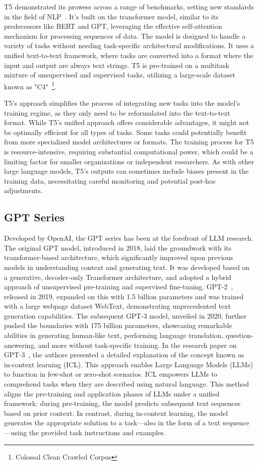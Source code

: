 T5 demonstrated its prowess across a range of benchmarks, setting new standards in the field of NLP~\cite{t5}.
It's built on the transformer model, similar to its predecessors like BERT and GPT, leveraging the effective self-attention mechanism for processing sequences of data.
The model is designed to handle a variety of tasks without needing task-specific architectural modifications.
It uses a unified text-to-text framework, where tasks are converted into a format where the input and output are always text strings.
T5 is pre-trained on a multitask mixture of unsupervised and supervised tasks, utilizing a large-scale dataset known as "C4"~\footnote{Colossal Clean Crawled Corpus}.

T5's approach simplifies the process of integrating new tasks into the model's training regime, as they only need to be reformulated into the text-to-text format.
While T5's unified approach offers considerable advantages, it might not be optimally efficient for all types of tasks.
Some tasks could potentially benefit from more specialized model architectures or formats.
The training process for T5 is resource-intensive, requiring substantial computational power, which could be a limiting factor for smaller organizations or independent researchers.
As with other large language models, T5's outputs can sometimes include biases present in the training data, necessitating careful monitoring and potential post-hoc adjustments.

\subsection{GPT Series}
\label{subsec:gpt-series}

Developed by OpenAI, the GPT series has been at the forefront of LLM research.
The original GPT model, introduced in 2018, laid the groundwork with its transformer-based architecture, which significantly improved upon previous models in understanding context and generating text.
It was developed based on a generative, decoder-only Transformer architecture, and adopted a hybrid approach of unsupervised pre-training and supervised fine-tuning.
GPT-2~\cite{gpt2}, released in 2019, expanded on this with 1.5 billion parameters and was trained with a large webpage dataset WebText, demonstrating unprecedented text generation capabilities.
The subsequent GPT-3 model, unveiled in 2020, further pushed the boundaries with 175 billion parameters, showcasing remarkable abilities in generating human-like text, performing language translation, question-answering, and more without task-specific training.
In the research paper on GPT-3~\cite{gpt3}, the authors presented a detailed explanation of the concept known as in-context learning (ICL). This approach enables Large Language Models (LLMs) to function in few-shot or zero-shot scenarios.
ICL empowers LLMs to comprehend tasks when they are described using natural language.
This method aligns the pre-training and application phases of LLMs under a unified framework: during pre-training, the model predicts subsequent text sequences based on prior context.
In contrast, during in-context learning, the model generates the appropriate solution to a task—also in the form of a text sequence—using the provided task instructions and examples.

